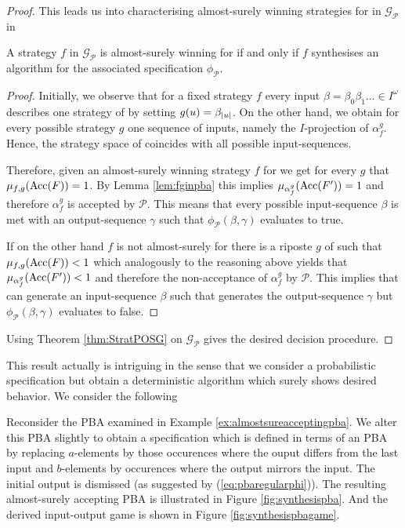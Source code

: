 \begin{proof}
  This leads us into characterising almost-surely winning strategies for \eve{} 
  in $\mathcal{G}_{\mathcal{P}}$ in
  \begin{lemma}
    A strategy $f$ in $\mathcal{G}_{\mathcal{P}}$ is almost-surely winning for
    \eve{} if and only if $f$ synthesises an algorithm for the associated 
    specification $\phi_{\mathcal{P}}$.
  \end{lemma}
  \begin{proof}
    Initially, we observe that for a fixed strategy $f$ every input
    $\beta = \beta_{0}\beta_{1}\dots\in I^{\omega}$ describes one strategy of 
    \adam{} by setting $g(u) = \beta_{\left\vert{u}\right\vert}$. On the other hand, we obtain
    for every possible strategy $g$ one sequence of inputs, namely the 
    $I$-projection of $\alpha_{f}^{g}$. Hence, the strategy space of \adam{}
    coincides with all possible input-sequences. 

    Therefore, given an almost-surely winning strategy $f$ for \eve{} we get 
    for every $g$ that $\mu_{f,g}(\operatorname{Acc}(F)) = 1$. By Lemma \ref{lem:fginpba} 
    this implies $\mu_{\alpha_{f}^{g}}(\operatorname{Acc}(F')) = 1$ and therefore 
    $\alpha_{f}^{g}$ is accepted by $\mathcal{P}$. This means that every 
    possible input-sequence $\beta$ is met with an output-sequence $\gamma$ 
    such that $\phi_{\mathcal{P}}(\beta, \gamma)$ evaluates to true.

    If on the other hand $f$ is not almost-surely for \eve{} there is a riposte 
    $g$ of \adam{} such that $\mu_{f,g}(\operatorname{Acc}(F)) < 1$ which analogously to the 
    reasoning above yields that $\mu_{\alpha_{f}^{g}}(\operatorname{Acc}(F')) < 1$ and 
    therefore the non-acceptance of $\alpha_{f}^{g}$ by $\mathcal{P}$. 
    This implies that \adam{} can generate an input-sequence $\beta$ such that 
    \eve{} generates the output-sequence $\gamma$ but 
    $\phi_{\mathcal{P}}(\beta, \gamma)$ evaluates to false.
  \end{proof}

  Using Theorem \ref{thm:StratPOSG} on $\mathcal{G}_{\mathcal{P}}$ gives the
  desired decision procedure.
\end{proof}
This result actually is intriguing in the sense that we consider a 
probabilistic specification but obtain a deterministic algorithm which surely 
shows desired behavior. We consider the following
\begin{example}
  Reconsider the \ac{PBA} examined in Example \ref{ex:almostsureacceptingpba}.
  We alter this \ac{PBA} slightly to obtain a specification which is defined in
  terms of an \ac{PBA} by replacing $a$-elements by those occurences where the
  ouput differs from the last input and $b$-elements by occurences where the 
  output mirrors the input. The initial output is dismissed (as suggested by
  (\ref{eq:pbaregularphi})). The resulting almost-surely accepting \ac{PBA} is
  illustrated in Figure \ref{fig:synthesispba}. And the derived input-output 
  game is shown in Figure \ref{fig:synthesispbagame}.
  \label{ex:pbasynthesis}
\end{example}

